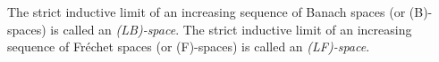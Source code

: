 The strict inductive limit of an increasing sequence of Banach spaces (or (B)-spaces) is called an \textit{(LB)-space}. The strict inductive limit of an increasing sequence of Fréchet spaces (or (F)-spaces) is called an \textit{(LF)-space}.
